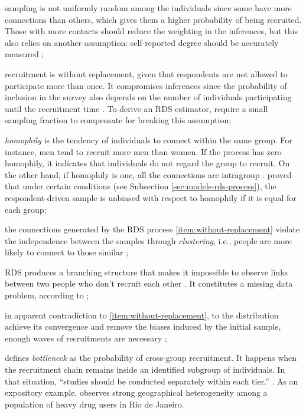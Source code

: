 \begin{alineas}
  \item sampling is not uniformly random among the individuals since some have more
  connections than others, which gives them a higher probability of being
  recruited. Those with more contacts should reduce the weighting in the
  inferences, but this also relies on another assumption: self-reported degree
  should be accurately measured \cite[p. 297]{gile2010respondent};
  
  \item \label{item:without-replacement} recruitment is without replacement, given that respondents are not
  allowed to participate more than once. It compromises inferences since the
  probability of inclusion in the survey also depends on the number of
  individuals participating until the recruitment time \cite[p.
  299]{gile2010respondent}. To derive an RDS estimator, 
  \textcite[p. 81]{volz2008probability} require a small sampling fraction to
  compensate for breaking this assumption;

  \item {\em homophily} is the tendency of individuals to connect within the same
  group. For instance, men tend to recruit more men than women. If the process
  has zero homophily, it indicates that individuals do not regard the group to
  recruit. On the other hand, if homophily is one, all the connections are
  intragroup \cite[p. 20]{heckathorn2002}. \textcite[p. 21]{heckathorn2002} proved
  that under certain conditions (see Subsection \ref{sec:models-rds-process}),
  the respondent-driven sample is unbiased with respect to homophily if it is
  equal for each group;

  \item the connections generated by the RDS process
  \autoref{item:without-replacement} violate the independence 
  between the samples through {\em clustering}, i.e., people are more likely 
  to connect to those similar \cite[p. 14]{avery2021statistical};
  
  \item RDS produces a branching structure that makes
  it impossible to observe links between two people who don't recruit each
  other \cite[p. 17]{gile2015network}. It constitutes a missing data problem, according to \textcite[p.
  190]{crawford2016};

  \item in apparent contradiction to \autoref{item:without-replacement}, to
  the distribution achieve its convergence and remove the biases induced by
  the initial sample, enough waves of recruitments are necessary \cite[p. 186]{heckathorn1997};
  
  \item \textcite[p. 2225]{goel2009respondent} defines {\em bottleneck}
  as the probability of cross-group recruitment. It happens when the
  recruitment chain remains inside an identified subgroup of individuals. In that
  situation, ``studies should be conducted separately within each tier.''
  \cite[p. 75]{gile2018methods}. As an expository example,
  \textcite[p. S139]{toledo2011putting} observes strong geographical
  heterogeneity among a population of heavy drug users in Rio de Janeiro. 
\end{alineas}

